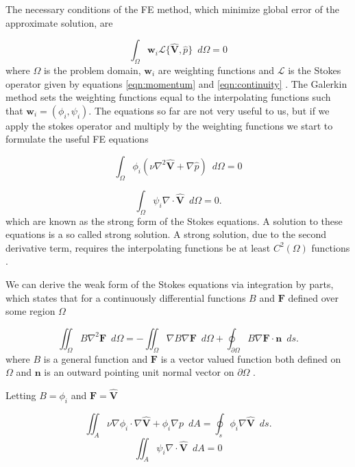 \documentclass[wrr]{agutex}  %
\newcommand{\p}{\partial}
\begin{document}
\begin{article}
The necessary conditions of the FE method, which minimize global error of the approximate solution, are 

\begin{equation}
\int_\Omega \mathbf{w}_i\mathcal{L}\{\hat{\mathbf{V}},\hat{p}\}\,\,\,d\Omega= 0 \label{eqn:galerkin}
\end{equation}
where $\Omega$ is the problem domain, $\mathbf{w}_i$ are weighting functions and $\mathcal{L}$ is the Stokes operator given by equations \ref{eqn:momentum} and \ref{eqn:continuity} \citep{Willis1987}.  The Galerkin method sets the weighting functions equal to the interpolating functions such that $\mathbf{w}_i = (\phi_i,\psi_i)$.  The equations so far are not very useful to us, but if we apply the stokes operator and multiply by the weighting functions we start to formulate the useful FE equations

\begin{equation}
\int_\Omega\phi_i(\nu \nabla^2 \hat{{\mathbf V}} + \nabla \hat{p})\,\,\,d\Omega= 0 
\end{equation}

\begin{equation}
\int_\Omega\psi_i\nabla \cdot \hat{\mathbf{V}}\,\,\,d\Omega= 0 .
\end{equation}
which are known as the strong form of the Stokes equations.  A solution to these equations is a so called strong solution. A strong solution, due to the second derivative term, requires the interpolating functions be at least $C^2(\Omega)$ functions \citep{Burkardt2005c}.

We can derive the weak form of the Stokes equations via integration by parts, which states that for a continuously differential functions $B$ and $\mathbf{F}$ defined over some region $\Omega$

\begin{equation}
  \iint_\Omega B\nabla^2\mathbf{F}\,\,\,d\Omega = -\iint_\Omega \nabla B \nabla \mathbf{F}\,\,\,d\Omega+\oint_{\partial\Omega}B\nabla \mathbf{F}\cdot\mathbf{n} \,\,\,ds.
\end{equation}
where $B$ is a general function and $\mathbf{F}$ is a vector valued function both defined on $\Omega$ and $\mathbf{n}$ is an outward pointing unit normal vector on $\p\Omega$ \citep{Marsden2003}.

Letting $B=\phi_i$ and $\mathbf{F}=\hat{\mathbf{V}}$

\begin{equation}
  \iint_A \nu \nabla\phi_i\cdot \nabla \hat{\mathbf{V}} 
  + \phi_i\nabla p\,\,\,dA  = \oint_s\phi_i\nabla \hat{\mathbf{V}} \,\,\,ds.
  \label{eqn:weak1}
\end{equation}
%
\begin{equation}
  \iint_A\psi_i\nabla \cdot \hat{\mathbf{V}}\,\,\,dA = 0
  \label{eqn:weak2}
\end{equation}


\end{article}
\end{document}
